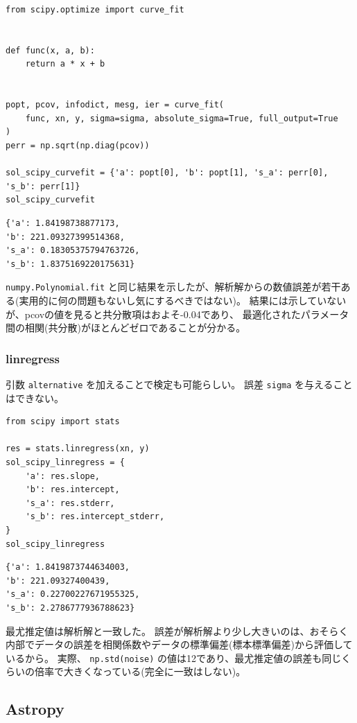\documentclass[a4paper, 9pt, notitlepage, uplatex, dvipdfmx]{jsarticle}
\begin{document}
\begin{verbatim}
from scipy.optimize import curve_fit


def func(x, a, b):
    return a * x + b


popt, pcov, infodict, mesg, ier = curve_fit(
    func, xn, y, sigma=sigma, absolute_sigma=True, full_output=True
)
perr = np.sqrt(np.diag(pcov))

sol_scipy_curvefit = {'a': popt[0], 'b': popt[1], 's_a': perr[0], 's_b': perr[1]}
sol_scipy_curvefit
\end{verbatim}

\label{}
\begin{verbatim}
{'a': 1.84198738877173,
'b': 221.09327399514368,
's_a': 0.18305375794763726,
's_b': 1.8375169220175631}
\end{verbatim}

\texttt{numpy.Polynomial.fit} と同じ結果を示したが、解析解からの数値誤差が若干ある(実用的に何の問題もないし気にするべきではない)。
結果には示していないが、pcovの値を見ると共分散項はおよそ-0.04であり、
最適化されたパラメータ間の相関(共分散)がほとんどゼロであることが分かる。
\subsubsection{linregress}
\label{sec:org9a53b0e}
引数 \texttt{alternative} を加えることで検定も可能らしい。
誤差 \texttt{sigma} を与えることはできない。

\begin{verbatim}
from scipy import stats

res = stats.linregress(xn, y)
sol_scipy_linregress = {
    'a': res.slope,
    'b': res.intercept,
    's_a': res.stderr,
    's_b': res.intercept_stderr,
}
sol_scipy_linregress
\end{verbatim}

\label{}
\begin{verbatim}
{'a': 1.8419873744634003,
'b': 221.09327400439,
's_a': 0.22700227671955325,
's_b': 2.2786777936788623}
\end{verbatim}

最尤推定値は解析解と一致した。
誤差が解析解より少し大きいのは、おそらく内部でデータの誤差を相関係数やデータの標準偏差(標本標準偏差)から評価しているから。
実際、 \texttt{np.std(noise)} の値は12であり、最尤推定値の誤差も同じくらいの倍率で大きくなっている(完全に一致はしない)。
\subsection{Astropy}
\label{sec:org2157464}
\end{document}
